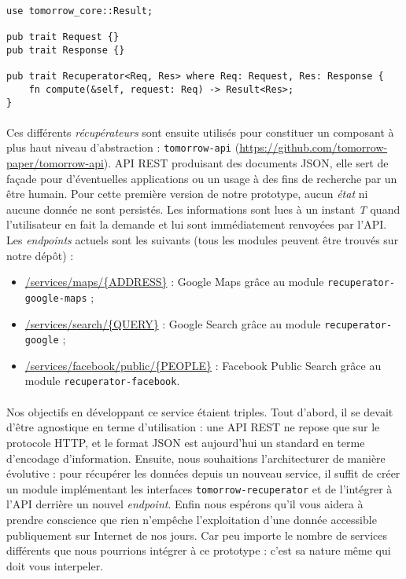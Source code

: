 \begin{lstlisting}
use tomorrow_core::Result;

pub trait Request {}
pub trait Response {}

pub trait Recuperator<Req, Res> where Req: Request, Res: Response {
    fn compute(&self, request: Req) -> Result<Res>;
}\end{lstlisting}

\paragraph{}\label{tomorrow-api} Ces différents \emph{récupérateurs} sont ensuite utilisés pour constituer un composant à plus haut niveau
d'abstraction : \lstinline{tomorrow-api} (\url{https://github.com/tomorrow-paper/tomorrow-api}). API REST produisant des
documents JSON, elle sert de façade pour d'éventuelles applications ou un usage à des fins de recherche par un être humain. 
Pour cette première version de notre prototype, aucun \emph{état} ni aucune donnée ne sont persistés. Les informations 
sont lues à un instant \emph{T} quand l'utilisateur en fait la demande et lui sont immédiatement renvoyées par l'API.
Les \emph{endpoints} actuels sont les suivants (tous les modules peuvent être trouvés sur notre dépôt) :

\begin{itemize}
    \item \url{/services/maps/{ADDRESS}} : Google Maps grâce au module \lstinline{recuperator-google-maps} ;
    \item \url{/services/search/{QUERY}} : Google Search grâce au module \lstinline{recuperator-google} ;
    \item \url{/services/facebook/public/{PEOPLE}} : Facebook Public Search grâce au module \lstinline{recuperator-facebook}.
\end{itemize}

\paragraph{} Nos objectifs en développant ce service étaient triples. Tout d'abord, il se devait d'être agnostique en terme
d'utilisation : une API REST ne repose que sur le protocole HTTP, et le format JSON est aujourd'hui un standard en terme
d'encodage d'information. Ensuite, nous souhaitions l'architecturer de manière évolutive : pour récupérer les données
depuis un nouveau service, il suffit de créer un module implémentant les interfaces \lstinline{tomorrow-recuperator} et
de l'intégrer à l'API derrière un nouvel \emph{endpoint}. Enfin nous espérons qu'il vous aidera à prendre conscience que
rien n'empêche l'exploitation d'une donnée accessible publiquement sur Internet de nos jours. Car peu importe le nombre
de services différents que nous pourrions intégrer à ce prototype : c'est sa nature même qui doit vous interpeler.